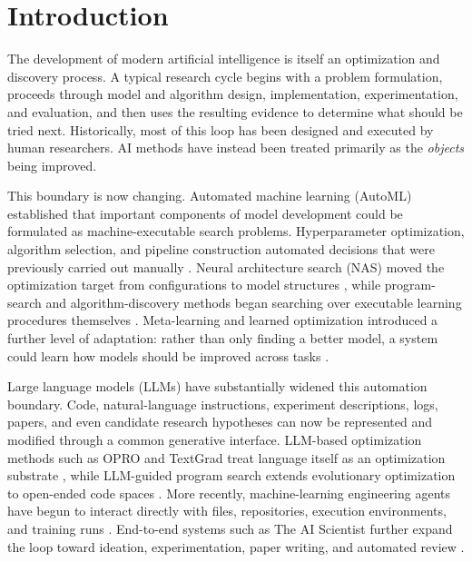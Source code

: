 \documentclass[journal]{IEEEtran}
\begin{document}
\section{Introduction}
\label{sec:introduction}

The development of modern artificial intelligence is itself an optimization and discovery process. A typical research cycle begins with a problem formulation, proceeds through model and algorithm design, implementation, experimentation, and evaluation, and then uses the resulting evidence to determine what should be tried next. Historically, most of this loop has been designed and executed by human researchers. AI methods have instead been treated primarily as the \emph{objects} being improved.

This boundary is now changing. Automated machine learning (AutoML) established that important components of model development could be formulated as machine-executable search problems. Hyperparameter optimization, algorithm selection, and pipeline construction automated decisions that were previously carried out manually \cite{bergstra2012random,thornton2013autoweka,feurer2015autosklearn}. Neural architecture search (NAS) moved the optimization target from configurations to model structures \cite{zoph2017nas,liu2019darts}, while program-search and algorithm-discovery methods began searching over executable learning procedures themselves \cite{real2020automlzero,romeraparedes2024funsearch}. Meta-learning and learned optimization introduced a further level of adaptation: rather than only finding a better model, a system could learn how models should be improved across tasks \cite{andrychowicz2016learning,finn2017maml,metz2022velo}.

Large language models (LLMs) have substantially widened this automation boundary. Code, natural-language instructions, experiment descriptions, logs, papers, and even candidate research hypotheses can now be represented and modified through a common generative interface. LLM-based optimization methods such as OPRO and TextGrad treat language itself as an optimization substrate \cite{yang2023opro,yuksekgonul2024textgrad}, while LLM-guided program search extends evolutionary optimization to open-ended code spaces \cite{romeraparedes2024funsearch}. More recently, machine-learning engineering agents have begun to interact directly with files, repositories, execution environments, and training runs \cite{huang2024mlagentbench,chan2025mlebench,jiang2025aide,nam2025mlestar}. End-to-end systems such as The AI Scientist further expand the loop toward ideation, experimentation, paper writing, and automated review \cite{lu2024aiscientist}.
\end{document}
